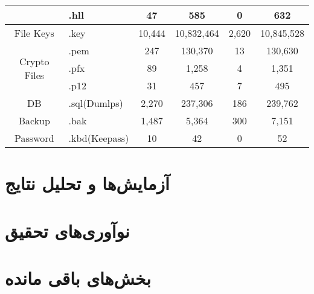 \documentclass[10pt, a4paper]{article}
\begin{document}
\begin{LTR}
\begin{table}[!h]
{\begin{tabular}{|c|l|ccc|c|}
                & .hll & 47 & 585 & 0 & 632 \\ \hline
                File Keys & .key & 10,444 & 10,832,464 & 2,620 & 10,845,528 \\ \hline
                \multirow{3}{*}{Crypto Files}
                & .pem & 247 & 130,370 & 13 & 130,630 \\
                & .pfx & 89 & 1,258 & 4 & 1,351  \\
                & .p12 & 31 & 457 & 7 & 495 \\ \hline
                DB & .sql(Dumlps) & 2,270 & 237,306 & 186 & 239,762 \\ \hline
                Backup & .bak & 1,487 & 5,364 & 300 & 7,151 \\ \hline
                Password & .kbd(Keepass) & 10 & 42 & 0 & 52 \\ \hline
            \end{tabular}
        }
    \end{table}
\end{LTR}


\section{آزمایش‌ها و تحلیل نتایج}

\section{نوآوری‌های تحقیق}

\section{بخش‌های باقی مانده}
\end{document}

